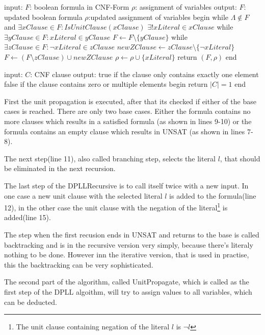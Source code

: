 \begin{algorithm}[caption={UnitPropagate}, label={algUnitProgagate}]
 input: $F$: boolean formula in CNF-Form
	$\rho$: assignment of variables
 output: $F$: updated boolean formula
	$\rho$:updated assignment of variables
 begin
   while $\Lambda \notin F$ and $\exists xClause \in F: IsUnitClause(xClause)$
	$\exists! xLiteral \in xClause$
	while $\exists yClause \in F: xLiteral \in yClause$
		$F \gets F \setminus \{yClause\}$     
	while $\exists zClause \in F: \lnot xLiteral \in zClause$
		$newZClause \gets zClause \setminus \{\lnot xLiteral\}$
		$F \gets (F \setminus zClause) \cup newZClause$
	$\rho \gets \rho \cup \{xLiteral\}$
   return $(F, \rho)$
 end
\end{algorithm}
\begin{algorithm}[caption={IsUnitClause}, label={algIsUnitClause}]
 input: $C$: CNF clause
 output: true if the clause only contains
		exactly one element
	false if the clause contains zero 
		or multiple elements
 begin
   return $|C| = 1$
 end
\end{algorithm}

First the unit propagation is executed, after that its checked if either of the base cases is reached. 
There are only two base cases. Either the formula contains no more clauses which results in a satisfied formula (as shown in lines 9-10) or the formula contains an empty clause which results in UNSAT (as shown in lines 7-8).

The next step(line 11), also called branching step, selects the literal $l$, that should be eliminated in the next recursion.

The last step of the DPLLRecursive is to call itself twice with a new input. In one case a new unit clause with the selected literal $l$ is added to the formula(line 12), in the other case the unit clause with the negation of the literal\footnote{The unit clause containing negation of the literal $l$ is $\lnot l$} is added(line 15).

The step when the first recusion ends in UNSAT and returns to the base is called backtracking and is in the recursive version very simply, because there's literaly nothing to be done. However inn the iterative version, that is used in practise, this the backtracking can be very sophisticated.

The second part of the algorithm, called UnitPropagate, which is called as the first step of the DPLL algoithm, will try to assign values to all variables, which can be deducted.


